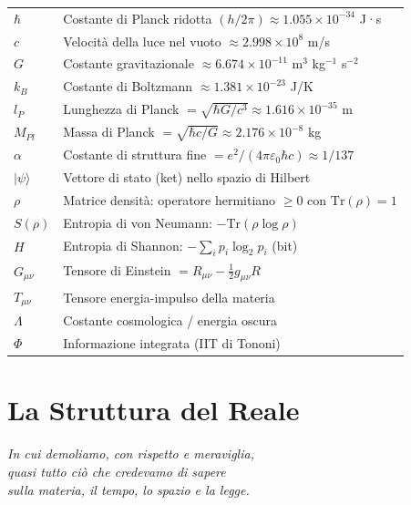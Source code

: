 \documentclass[12pt,a4paper,openany]{book}
\begin{document}
\begin{tabular}{ll}
$\hbar$ & Costante di Planck ridotta $(h/2\pi) \approx 1.055 \times 10^{-34}$ J·s \\[4pt]
$c$ & Velocità della luce nel vuoto $\approx 2.998 \times 10^8$ m/s \\[4pt]
$G$ & Costante gravitazionale $\approx 6.674 \times 10^{-11}$ m$^3$ kg$^{-1}$ s$^{-2}$ \\[4pt]
$k_B$ & Costante di Boltzmann $\approx 1.381 \times 10^{-23}$ J/K \\[4pt]
$l_P$ & Lunghezza di Planck $= \sqrt{\hbar G/c^3} \approx 1.616 \times 10^{-35}$ m \\[4pt]
$M_{Pl}$ & Massa di Planck $= \sqrt{\hbar c/G} \approx 2.176 \times 10^{-8}$ kg \\[4pt]
$\alpha$ & Costante di struttura fine $= e^2/(4\pi\varepsilon_0\hbar c) \approx 1/137$ \\[4pt]
$|\psi\rangle$ & Vettore di stato (ket) nello spazio di Hilbert \\[4pt]
$\rho$ & Matrice densità: operatore hermitiano $\geq 0$ con $\mathrm{Tr}(\rho)=1$ \\[4pt]
$S(\rho)$ & Entropia di von Neumann: $-\mathrm{Tr}(\rho\log\rho)$ \\[4pt]
$H$ & Entropia di Shannon: $-\sum_i p_i \log_2 p_i$ (bit) \\[4pt]
$G_{\mu\nu}$ & Tensore di Einstein $= R_{\mu\nu} - \tfrac{1}{2}g_{\mu\nu}R$ \\[4pt]
$T_{\mu\nu}$ & Tensore energia-impulso della materia \\[4pt]
$\Lambda$ & Costante cosmologica / energia oscura \\[4pt]
$\Phi$ & Informazione integrata (IIT di Tononi) \\[4pt]
\end{tabular}

\clearpage

\tableofcontents
\clearpage

\part{La Struttura del Reale}
\begin{center}
\itshape
In cui demoliamo, con rispetto e meraviglia,\\
quasi tutto ciò che credevamo di sapere\\
sulla materia, il tempo, lo spazio e la legge.
\end{center}
\clearpage
\end{document}
